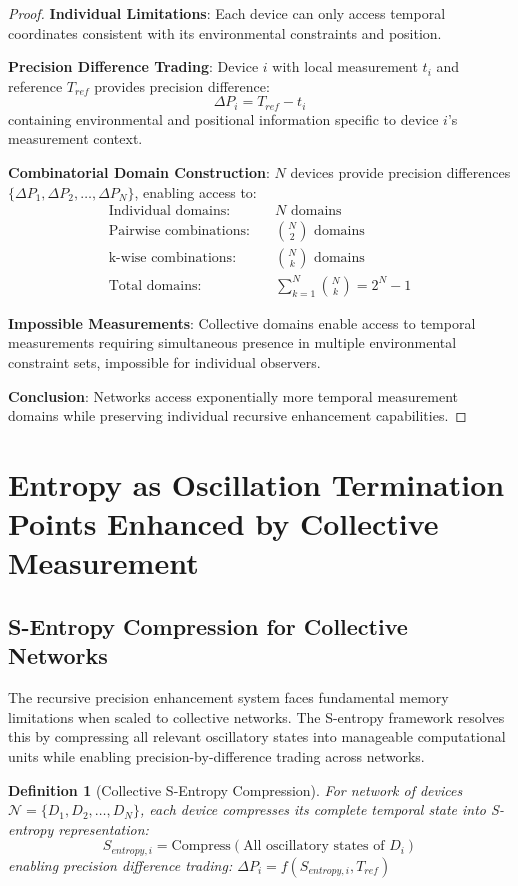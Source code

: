\documentclass[12pt,a4paper]{article}
\newtheorem{definition}[theorem]{Definition}
\begin{document}
\begin{proof}
\textbf{Individual Limitations}: Each device can only access temporal coordinates consistent with its environmental constraints and position.

\textbf{Precision Difference Trading}: Device $i$ with local measurement $t_i$ and reference $T_{ref}$ provides precision difference:
$$\Delta P_i = T_{ref} - t_i$$
containing environmental and positional information specific to device $i$'s measurement context.

\textbf{Combinatorial Domain Construction}: $N$ devices provide precision differences $\{\Delta P_1, \Delta P_2, \ldots, \Delta P_N\}$, enabling access to:
\begin{align}
\text{Individual domains}: &\quad N \text{ domains} \\
\text{Pairwise combinations}: &\quad \binom{N}{2} \text{ domains} \\
\text{k-wise combinations}: &\quad \binom{N}{k} \text{ domains} \\
\text{Total domains}: &\quad \sum_{k=1}^{N} \binom{N}{k} = 2^N - 1
\end{align}

\textbf{Impossible Measurements}: Collective domains enable access to temporal measurements requiring simultaneous presence in multiple environmental constraint sets, impossible for individual observers.

\textbf{Conclusion}: Networks access exponentially more temporal measurement domains while preserving individual recursive enhancement capabilities.
\end{proof}

\section{Entropy as Oscillation Termination Points Enhanced by Collective Measurement}

\subsection{S-Entropy Compression for Collective Networks}

The recursive precision enhancement system faces fundamental memory limitations when scaled to collective networks. The S-entropy framework resolves this by compressing all relevant oscillatory states into manageable computational units while enabling precision-by-difference trading across networks.

\begin{definition}[Collective S-Entropy Compression]
For network of devices $\mathcal{N} = \{D_1, D_2, \ldots, D_N\}$, each device compresses its complete temporal state into S-entropy representation:
$$S_{entropy,i} = \text{Compress}(\text{All oscillatory states of } D_i)$$
enabling precision difference trading: $\Delta P_i = f(S_{entropy,i}, T_{ref})$
\end{definition}
\end{document}
